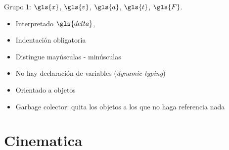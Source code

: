 \documentclass[letterpaper,12pt]{article}
\begin{document}
Grupo 1: $\gls{x}$, $\gls{v}$, $\gls{a}$, $\gls{t}$,
$\gls{F}$.

\begin{itemize}
    \item Interpretado $\gls{delta}$,
    \item Indentación obligatoria
    \item Distingue mayúsculas - minúsculas
    \item No hay declaración de variables (\textit{dynamic typing})
    \item Orientado a objetos  
    \item Garbage colector: quita los objetos a los que no haga referencia nada
\end{itemize}

\section{Cinematica}
\end{document}
